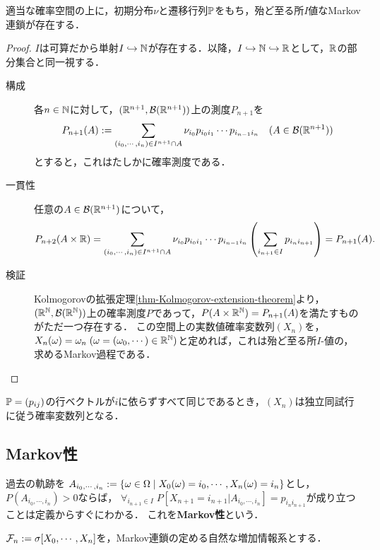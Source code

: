 \documentclass[uplatex,dvipdfmx]{jsreport}
\begin{document}
\begin{proposition}
    適当な確率空間の上に，初期分布$\nu$と遷移行列$\mathbb{P}$をもち，殆ど至る所$I$値なMarkov連鎖が存在する．
\end{proposition}
\begin{proof}
    $I$は可算だから単射$I\hookrightarrow\mathbb{N}$が存在する．以降，$I\hookrightarrow\mathbb{N}\hookrightarrow\mathbb{R}$として，$\mathbb{R}$の部分集合と同一視する．
    \begin{description}
        \item[構成] 各$n\in\mathbb{N}$に対して，$(\mathbb{R}^{n+1},\mathcal{B}(\mathbb{R}^{n+1}))$上の測度$P_{n+1}$を
        \[P_{n+1}(A):=\sum_{(i_0,\cdots,i_n)\in I^{n+1}\cap A}\nu_{i_0}p_{i_0i_1}\cdots p_{i_{n-1}i_n}\quad(A\in\mathcal{B}(\mathbb{R}^{n+1}))\]
        とすると，これはたしかに確率測度である．
        \item[一貫性] 任意の$A\in\mathcal{B}(\mathbb{R}^{n+1})$について，
        \[P_{n+2}(A\times\mathbb{R})=\sum_{(i_0,\cdots,i_n)\in I^{n+1}\cap A}\nu_{i_0}p_{i_0i_1}\cdots p_{i_{n-1}i_n}\left(\sum_{i_{n+1}\in I}p_{i_ni_{n+1}}\right)=P_{n+1}(A).\]
        \item[検証] Kolmogorovの拡張定理\ref{thm-Kolmogorov-extension-theorem}より，$(\mathbb{R}^{\mathbb{N}},\mathcal{B}(\mathbb{R}^{\mathbb{N}}))$上の確率測度$P$であって，$P(A\times\mathbb{R}^{\mathbb{N}})=P_{n+1}(A)$を満たすものがただ一つ存在する．
        この空間上の実数値確率変数列$(X_n)$を，$X_n(\omega)=\omega_n\;(\omega=(\omega_0,\cdots)\in\mathbb{R}^{\mathbb{N}})$と定めれば，これは殆ど至る所$I$-値の，求めるMarkov過程である．
    \end{description}
\end{proof}

\begin{example}[i.i.d.はMarkov過程]
    $\mathbb{P}=(p_{ij})$の行ベクトルが$i$に依らずすべて同じであるとき，$(X_n)$は独立同試行に従う確率変数列となる．
\end{example}

\subsection{Markov性}

\begin{definition}
    過去の軌跡を
    $A_{i_0,\cdots,i_n}:=\left\{\omega\in\Omega\mid X_0(\omega)=i_0,\cdots,X_n(\omega)=i_n\right\}$とし，$P(A_{i_0,\cdots,i_n})>0$ならば，
    $\forall_{i_{n+1}\in I}\;P[X_{n+1}=i_{n+1}|A_{i_0,\cdots,i_n}]=p_{i_ni_{n+1}}$が成り立つことは定義からすぐにわかる．
    これを\textbf{Markov性}という．
\end{definition}

\begin{notation}
    $\mathcal{F}_n:=\sigma[X_0,\cdots,X_n]$を，Markov連鎖の定める自然な増加情報系とする．
\end{notation}
\end{document}
